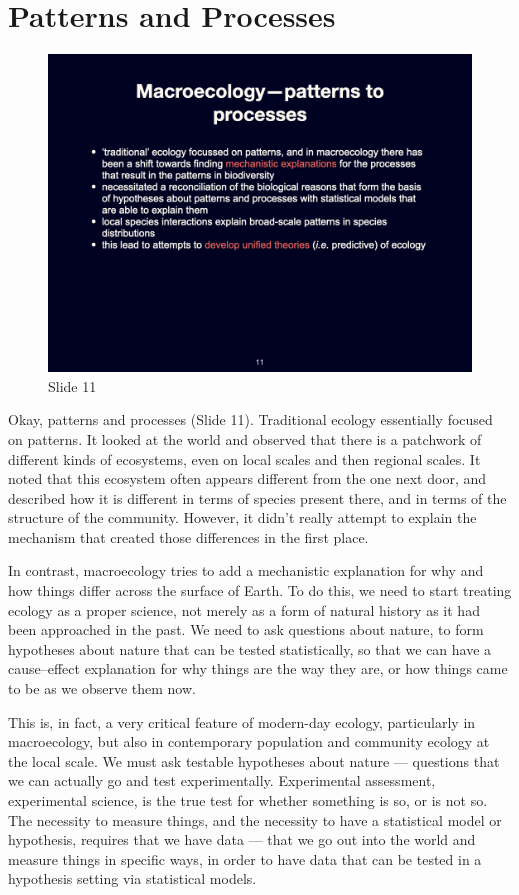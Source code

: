 \documentclass[
  10pt,
]{book}
\begin{document}
\section{Patterns and Processes}\label{patterns-and-processes}

\begin{figure}[ht]
\centering
\includegraphics[width=0.8\linewidth]{../images/BDC334/BDC334-011.jpeg}
\caption*{Slide 11}
\end{figure}

Okay, patterns and processes (Slide 11). Traditional ecology essentially
focused on patterns. It looked at the world and observed that there is a
patchwork of different kinds of ecosystems, even on local scales and
then regional scales. It noted that this ecosystem often appears
different from the one next door, and described how it is different in
terms of species present there, and in terms of the structure of the
community. However, it didn't really attempt to explain the mechanism
that created those differences in the first place.

In contrast, macroecology tries to add a mechanistic explanation for why
and how things differ across the surface of Earth. To do this, we need
to start treating ecology as a proper science, not merely as a form of
natural history as it had been approached in the past. We need to ask
questions about nature, to form hypotheses about nature that can be
tested statistically, so that we can have a cause--effect explanation
for why things are the way they are, or how things came to be as we
observe them now.

This is, in fact, a very critical feature of modern-day ecology,
particularly in macroecology, but also in contemporary population and
community ecology at the local scale. We must ask testable hypotheses
about nature --- questions that we can actually go and test
experimentally. Experimental assessment, experimental science, is the
true test for whether something is so, or is not so. The necessity to
measure things, and the necessity to have a statistical model or
hypothesis, requires that we have data --- that we go out into the world
and measure things in specific ways, in order to have data that can be
tested in a hypothesis setting via statistical models.
\end{document}
